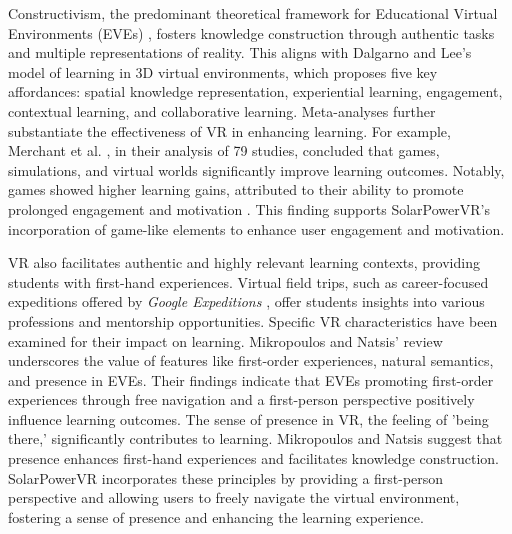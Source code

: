 \documentclass[draft, final]{vutinfth} %
\begin{document}
Constructivism, the predominant theoretical framework for Educational Virtual Environments (EVEs) \cite{Mikropoulos2011VrEducational}, fosters knowledge construction through authentic tasks and multiple representations of reality. This aligns with Dalgarno and Lee's \cite{Dalgarno2010Learning} model of learning in 3D virtual environments, which proposes five key affordances: spatial knowledge representation, experiential learning, engagement, contextual learning, and collaborative learning. Meta-analyses further substantiate the effectiveness of VR in enhancing learning. For example, Merchant et al. \cite{Merchant2014VrEffectiveness}, in their analysis of 79 studies, concluded that games, simulations, and virtual worlds significantly improve learning outcomes. Notably, games showed higher learning gains, attributed to their ability to promote prolonged engagement and motivation \cite{Gee2012Situated}. This finding supports SolarPowerVR's incorporation of game-like elements to enhance user engagement and motivation.

VR also facilitates authentic and highly relevant learning contexts, providing students with first-hand experiences. Virtual field trips, such as career-focused expeditions offered by \textit{Google Expeditions} \cite{Sung2015Effects}, offer students insights into various professions and mentorship opportunities. Specific VR characteristics have been examined for their impact on learning. Mikropoulos and Natsis' review \cite{Mikropoulos2011VrEducational} underscores the value of features like first-order experiences, natural semantics, and presence in EVEs. Their findings indicate that EVEs promoting first-order experiences through free navigation and a first-person perspective positively influence learning outcomes. The sense of presence in VR, the feeling of 'being there,' significantly contributes to learning. Mikropoulos and Natsis \cite{Mikropoulos2011VrEducational} suggest that presence enhances first-hand experiences and facilitates knowledge construction. SolarPowerVR incorporates these principles by providing a first-person perspective and allowing users to freely navigate the virtual environment, fostering a sense of presence and enhancing the learning experience.
\end{document}

